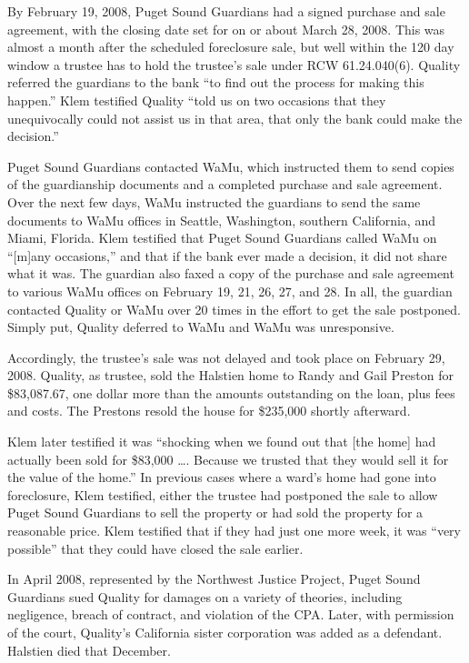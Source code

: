 By February 19, 2008, Puget Sound Guardians had a signed purchase and
sale agreement, with the closing date set for on or about March 28, 2008. This
was almost a month after the scheduled foreclosure sale, but well within the
120 day window a trustee has to hold the trustee's sale under RCW 61.24.040(6).
Quality referred the guardians to the bank ``to find out the process for making
this happen.'' Klem testified Quality ``told us on two occasions that they
unequivocally could not assist us in that area, that only the bank could make
the decision.'' 

Puget Sound Guardians contacted WaMu, which instructed them to send
copies of the guardianship documents and a completed purchase and sale
agreement. Over the next few days, WaMu instructed the guardians to send the
same documents to WaMu offices in Seattle, Washington, southern California, and
Miami, Florida. Klem testified that Puget Sound Guardians called WaMu on
``[m]any occasions,'' and that if the bank ever made a decision, it did not
share what it was. The guardian also faxed a copy of the purchase and sale
agreement to various WaMu offices on February 19, 21, 26, 27, and 28. In all,
the guardian contacted Quality or WaMu over 20 times in the effort to get the
sale postponed. Simply put, Quality deferred to WaMu and WaMu was unresponsive.

Accordingly, the trustee's sale was not delayed and took place on
February 29, 2008. Quality, as trustee, sold the Halstien home to Randy and
Gail Preston for \$83,087.67, one dollar more than the amounts outstanding on
the loan, plus fees and costs. The Prestons resold the
house for \$235,000 shortly afterward.

Klem later testified it was ``shocking when we found out that [the home]
had actually been sold for \$83,000 \dots . Because we trusted that they would
sell it for the value of the home.'' In previous cases where a ward's home had
gone into foreclosure, Klem testified, either the trustee had postponed the
sale to allow Puget Sound Guardians to sell the property or had sold the
property for a reasonable price. Klem testified that if they had just one more
week, it was ``very possible'' that they could have closed the sale earlier. 

In April 2008, represented by the Northwest Justice Project, Puget Sound
Guardians sued Quality for damages on a variety of theories, including
negligence, breach of contract, and violation of the CPA. Later, with
permission of the court, Quality's California sister corporation was added as a
defendant. Halstien died that December.

